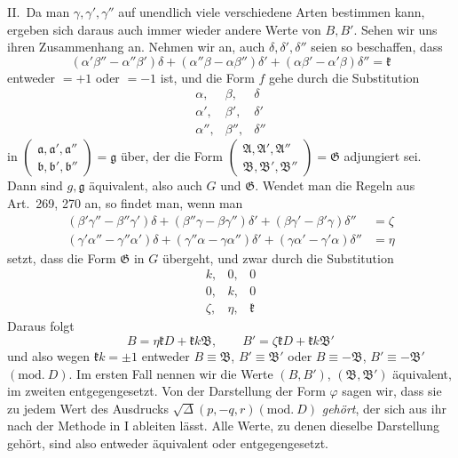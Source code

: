 II.\ Da man $\gamma,\gamma',\gamma''$ auf unendlich viele verschiedene Arten bestimmen
kann, ergeben sich daraus auch immer wieder andere Werte von $B,B'$.
Sehen wir uns ihren Zusammenhang an. Nehmen wir an, auch $\delta,\delta',\delta''$ seien
so beschaffen, dass
\[
(\alpha'\beta''-\alpha''\beta')\delta+
(\alpha''\beta-\alpha\beta'')\delta'+
(\alpha\beta'-\alpha'\beta)\delta''=\mathfrak{k}
\]
entweder $=+1$ oder $=-1$ ist, und die Form $f$ gehe durch
die Substitution
\[
\begin{array}{ccc}
\alpha,&\beta,&\delta\\
\alpha',&\beta',&\delta'\\
\alpha'',&\beta'',&\delta''
\end{array}
\]
in
$\left(\begin{smallmatrix}\mathfrak{a},\mathfrak{a}',\mathfrak{a}''\\\mathfrak{b},\mathfrak{b}',\mathfrak{b}''\end{smallmatrix}\right)=\mathfrak{g}$
über, der die Form
$\left(\begin{smallmatrix}\mathfrak{A},\mathfrak{A}',\mathfrak{A}''\\\mathfrak{B},\mathfrak{B}',\mathfrak{B}''\end{smallmatrix}\right)=\mathfrak{G}$
adjungiert sei. Dann sind $g,\mathfrak{g}$ äquivalent, also auch $G$ und $\mathfrak{G}$.
Wendet man die Regeln aus Art.\ 269, 270 an,
so findet man, wenn man
\[
\begin{aligned}
(\beta'\gamma''-\beta''\gamma')\delta+
(\beta''\gamma-\beta\gamma'')\delta'+
(\beta\gamma'-\beta'\gamma)\delta''&=\zeta\\
(\gamma'\alpha''-\gamma''\alpha')\delta+
(\gamma''\alpha-\gamma\alpha'')\delta'+
(\gamma\alpha'-\gamma'\alpha)\delta''&=\eta
\end{aligned}
\]
setzt, dass die Form $\mathfrak{G}$ in $G$ übergeht, und zwar durch die Substitution
\[
\begin{array}{ccc}
k,&0,&0\\
0,&k,&0\\
\zeta,&\eta,&\mathfrak{k}
\end{array}
\]
Daraus folgt
\[
B=\eta\mathfrak{k}D+\mathfrak{k}k\mathfrak{B},\qquad
B'=\zeta\mathfrak{k}D+\mathfrak{k}k\mathfrak{B}'
\]
und also wegen $\mathfrak{k}k=\pm1$ entweder $B\equiv\mathfrak{B}$, $B'\equiv\mathfrak{B}'$ oder $B\equiv-\mathfrak{B}$, $B'\equiv-\mathfrak{B}'$
$(\mathrm{mod.}\ D)$. Im ersten Fall nennen wir die Werte $(B,B')$, $(\mathfrak{B},\mathfrak{B}')$ äquivalent,
im zweiten entgegengesetzt. Von der Darstellung der Form $\varphi$ sagen
wir, dass sie zu jedem Wert des
Ausdrucks $\surd\Delta(p,\allowbreak -q,\allowbreak r)(\mathrm{mod.}\ D)$ \textit{gehört}, der sich aus ihr nach der Methode in I
ableiten lässt. Alle Werte, zu denen dieselbe Darstellung gehört, sind
also entweder äquivalent oder entgegengesetzt.

